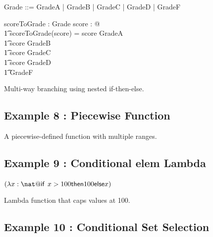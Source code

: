 \documentclass[a4paper,10pt,fleqn]{article}
\begin{document}
\begin{zed}Grade ::= GradeA | GradeB | GradeC | GradeD | GradeF\end{zed}

\begin{axdef}
scoreToGrade : \nat \fun Grade
\where
\forall score : \nat @ \\
\t1 scoreToGrade(score) = \IF score  \THEN GradeA \\
\t1 \ELSE \IF score  \THEN GradeB \\
\t1 \ELSE \IF score  \THEN GradeC \\
\t1 \ELSE \IF score  \THEN GradeD \\
\t1 \ELSE GradeF
\end{axdef}

\noindent Multi-way branching using nested if-then-else.

\bigskip

\subsection*{Example 8 : Piecewise Function}


\noindent A piecewise-defined function with multiple ranges.

\bigskip

\subsection*{Example 9 : Conditional elem Lambda}

\noindent
$(\lambda x : \nat @ \IF x > 100 \THEN 100 \ELSE x)$


\noindent Lambda function that caps values at 100.

\bigskip

\subsection*{Example 10 : Conditional Set Selection}
\end{document}
